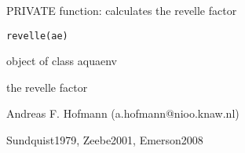 \documentclass{article}
\begin{document}
\begin{Description}\relax
PRIVATE function: calculates the revelle factor
\end{Description}
\begin{Usage}
\begin{verbatim}revelle(ae)\end{verbatim}
\end{Usage}
\begin{Arguments}
\begin{ldescription}
\item[\code{ae }] object of class aquaenv
\end{ldescription}
\end{Arguments}
\begin{Value}
the revelle factor
\end{Value}
\begin{Author}\relax
Andreas F. Hofmann (a.hofmann@nioo.knaw.nl)
\end{Author}
\begin{References}\relax
Sundquist1979, Zeebe2001, Emerson2008
\end{References}
\end{document}
